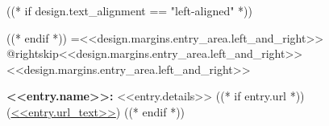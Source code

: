 \begingroup((* if design.text_alignment == "left-aligned" *))\raggedright((* endif *))
\leftskip=<<design.margins.entry_area.left_and_right>>
\advance\csname @rightskip\endcsname <<design.margins.entry_area.left_and_right>>
\advance\rightskip <<design.margins.entry_area.left_and_right>>

\textbf{<<entry.name>>:} <<entry.details>> ((* if entry.url *)) (\href{<<entry.url>>}{<<entry.url_text>>}) ((* endif *))
\par\endgroup